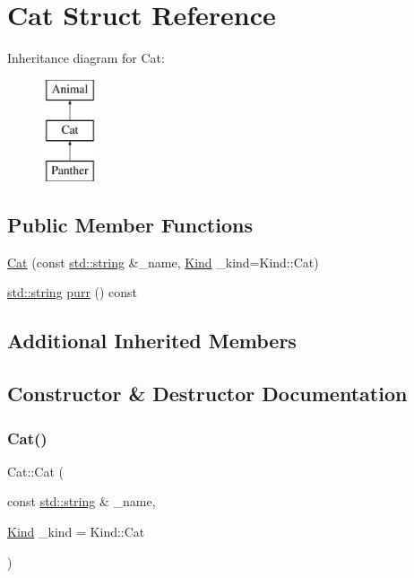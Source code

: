 \hypertarget{struct_cat}{}\section{Cat Struct Reference}
\label{struct_cat}
Inheritance diagram for Cat\+:\begin{figure}[H]
\begin{center}
\leavevmode
\includegraphics[height=3.000000cm]{struct_cat}
\end{center}
\end{figure}
\subsection*{Public Member Functions}
\begin{DoxyCompactItemize}
\item 
\mbox{\hyperlink{struct_cat_ad3f664b4076f035f7a84076eb3822477}{Cat}} (const \mbox{\hyperlink{_s_d_l__opengl__glext_8h_ab4ccfaa8ab0e1afaae94dc96ef52dde1}{std\+::string}} \&\+\_\+name, \mbox{\hyperlink{struct_animal_abd6bed3bf6361cc3dc37c03f297e3f48}{Kind}} \+\_\+kind=Kind\+::\+Cat)
\item 
\mbox{\hyperlink{_s_d_l__opengl__glext_8h_ab4ccfaa8ab0e1afaae94dc96ef52dde1}{std\+::string}} \mbox{\hyperlink{struct_cat_ae9dbc30672ea0d779fd109c73dc5a343}{purr}} () const
\end{DoxyCompactItemize}
\subsection*{Additional Inherited Members}


\subsection{Constructor \& Destructor Documentation}
\mbox{\label{struct_cat_ad3f664b4076f035f7a84076eb3822477}} 
\subsubsection{\texorpdfstring{Cat()}{Cat()}}
{\footnotesize\ttfamily Cat\+::\+Cat (\begin{DoxyParamCaption}\item[{const \mbox{\hyperlink{_s_d_l__opengl__glext_8h_ab4ccfaa8ab0e1afaae94dc96ef52dde1}{std\+::string}} \&}]{\+\_\+name,  }\item[{\mbox{\hyperlink{struct_animal_abd6bed3bf6361cc3dc37c03f297e3f48}{Kind}}}]{\+\_\+kind = {\ttfamily Kind\+:\+:Cat} }\end{DoxyParamCaption})\hspace{0.3cm}{\ttfamily [inline]}}



